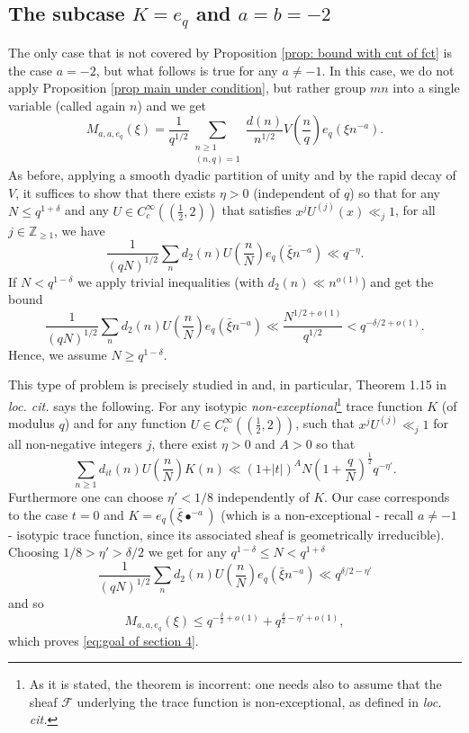 \documentclass[12pt]{amsart}
\theoremstyle{plain}
\theoremstyle{definition}
\theoremstyle{remark}
\numberwithin{equation}{section}
\newcommand{\ZZ}{\mathbb{Z}}
\renewcommand{\geq}{\geqslant}
\renewcommand{\leq}{\leqslant}
\begin{document}
\subsection*{The subcase $K=e_q$ and $a=b=-2$}
The only case that is not covered by Proposition \ref{prop: bound with cut of fct} is the case $a=-2$, but what follows is true for any $a\neq -1$. In this case, we do not apply Proposition \ref{prop main under condition}, but rather group $mn$ into a single variable (called again $n$) and we get 
\begin{equation*}
    M_{a,a,e_q}(\xi) = \frac{1}{q^{1/2}}\sum_{\substack{n\geq 1\\(n,q)=1}}\frac{d(n)}{n^{1/2}}V\left(\frac{n}{q}\right)e_q(\xi n^{-a}).
\end{equation*}
As before, applying a smooth dyadic partition of unity and by the rapid decay of $V$, it suffices to show that there exists $\eta>0$ (independent of $q$) so that for any $N\leq q^{1+\delta}$ and any $U \in C_c^{\infty}(\left(\frac{1}{2},2\right))$ that satisfies $x^jU^{(j)}(x) \ll_j 1$, for all $j \in \ZZ_{\geq 1}$, we have
\begin{equation*}
    \frac{1}{(qN)^{1/2}}\sum_{n}d_2(n)U\left(\frac{n}{N}\right)e_q(\bar \xi{n^{-a}}) \ll q^{-\eta}.
\end{equation*}
If $N<q^{1-\delta}$ we apply trivial inequalities (with $d_2(n) \ll n^{o(1)}$) and get the bound 
\[\frac{1}{(qN)^{1/2}}\sum_nd_2(n)U\left(\frac{n}{N}\right)e_q(\bar\xi n^{-a}) \ll \frac{N^{1/2+o(1)}}{q^{1/2}} < q^{-\delta/2+o(1)}.\] Hence, we assume $N\geq q^{1-\delta}$. 

This type of problem is precisely studied in \cite{FKM_algebraic_over_primes} and, in particular, Theorem 1.15 in \emph{loc. cit.} says the following. For any isotypic \emph{non-exceptional}\footnote{As it is stated, the theorem is incorrent: one needs  also to assume that the sheaf $\mathcal{F}$ underlying the trace function is non-exceptional, as defined in \emph{loc. cit.}} trace function $K$ (of modulus $q$) and for any function $U\in C_c^{\infty}((\frac{1}{2},2))$, such that $x^jU^{(j)}\ll_j 1$ for all non-negative integers $j$, there exist $\eta >0$ and $A>0$ so that
\begin{equation*}
    \sum_{n\geq 1}d_{it}(n) U\left(\frac{n}{N}\right)K(n) \ll (1+\vert{t}\vert)^AN(1+\frac{q}{N})^{\frac{1}{2}}q^{-\eta'}.
\end{equation*}
Furthermore one can choose $\eta' < 1/8$ independently of $K$. Our case corresponds to the case $t=0$ and $K=e_q(\bar \xi \bullet^{-a})$ (which is a non-exceptional - recall $a \neq -1$ - isotypic trace function, since its associated sheaf is geometrically irreducible). Choosing $1/8>\eta' > \delta/2$ we get for any $q^{1-\delta}\leq N<q^{1+\delta}$  
\[ \frac{1}{(qN)^{1/2}}\sum_n d_2(n)U\left(\frac{n}{N}\right)e_q(\bar\xi n^{-a}) \ll q^{\delta/2-\eta'} \]
and so 
\[M_{a,a,e_q}(\xi) \leq q^{-\frac{\delta}{2}+o(1)}+q^{\frac\delta 2-\eta'+o(1)},\]
which proves \eqref{eq:goal of section 4}.
\end{document}
